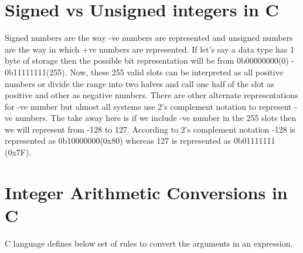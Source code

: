 \documentclass{article}
\begin{document}
\section{Signed vs Unsigned integers in C}
Signed numbers are the way -ve numbers are represented and unsigned numbers are
the way in which +ve numbers are represented. If let's say a data type has 1
byte of storage then the possible bit representation will be from  0b00000000(0)
- 0b11111111(255). Now, these 255 valid slots can be interpreted as all positive
numbers or divide the range into two halves and call one half of the slot as
positive and other as negative numbers. There are other alternate representations
for -ve number but almost all systems use 2's complement notation to represent
-ve numbers. The take away here is if we include -ve number in the 255 slots
then we will represent from -128 to 127. According to 2's complement notation
-128 is represented as 0b10000000(0x80) whereas 127 is represented as 0b01111111
(0x7F).

\section{Integer Arithmetic Conversions in C}
C language defines below set of rules to convert the arguments in an expression.
\end{document}
